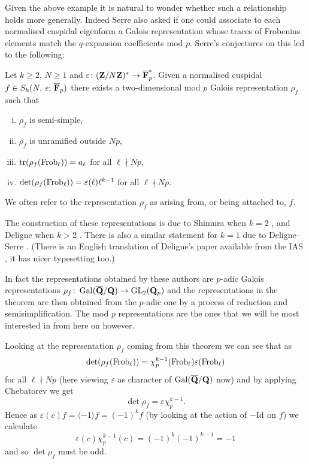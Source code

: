 \documentclass[a4paper,12pt]{article}
\begin{document}
Given the above example it is natural to wonder whether such a relationship holds more generally.
Indeed Serre also asked if one could associate to each normalised cuspidal eigenform a Galois representation whose traces of Frobenius elements match the $q$-expansion coefficients mod $p$.
Serre's conjectures on this led to the following: %

\begin{thm}\label{thm:assoc}
Let $k \ge 2$, $N \ge 1$ and $\varepsilon\colon (\mathbf{Z}/N\mathbf{Z})^* \to \overline{\mathbf{F}}_p^*$. Given a normalised cuspidal $f\in S_k(N,\,\varepsilon;\,\overline{\mathbf{F}}_p)$ there exists a two-dimensional mod $p$ Galois representation $\rho_f$ such that
\begin{enumerate}[(i)]
\item $\rho_f$ is semi-simple,
\item $\rho_f$ is unramified outside $Np$,
\item $\operatorname{tr}(\rho_f (\operatorname{Frob}_\ell)) = a_\ell$ for all $\ell \nmid Np$,
\item $\det(\rho_f (\operatorname{Frob}_\ell)) = \varepsilon(\ell)\ell^{k-1}$ for all $\ell \nmid Np$. %
\end{enumerate}
We often refer to the representation $\rho_f$ as arising from, or being attached to, $f$.
\end{thm}

The construction of these representations is due to Shimura when $k = 2$ \cite{Shimura}, and Deligne when $k > 2$ \cite{Deligne}.
There is also a similar statement for $k = 1$ due to Deligne--Serre \cite{DeligneSerre}.
(There is an English translation of Deligne's paper available from the IAS \cite{DeligneEng}, it has nicer typesetting too.) %

In fact the representations obtained by these authors are $p$-adic Galois representations $\rho_f\colon \operatorname{Gal}(\overline{\mathbf{Q}}/\mathbf{Q}) \to \operatorname{GL}_2(\mathbf{Q}_p)$ and the representations in the theorem are then obtained from the $p$-adic one by a process of reduction and semisimplification. %
The mod $p$ representations are the ones that we will be most interested in from here on however.

\begin{rmk}\label{rmk:detrho}
Looking at the representation $\rho_f$ coming from this theorem we can see that as
\[
\det(\rho_f(\operatorname{Frob}_\ell)) = \chi_p^{k-1}(\operatorname{Frob}_\ell)\varepsilon(\operatorname{Frob}_\ell)
\]
for all $\ell \nmid Np$ (here viewing $\varepsilon$ as character of $\operatorname{Gal}(\overline{\mathbf{Q}}/\mathbf{Q})$ now) and by applying Chebatorev we get %
\[
\det\rho_f = \varepsilon\chi_p^{k-1}.
\]
Hence as $\varepsilon(c)f = \langle -1 \rangle f = (-1)^k f$ (by looking at the action of $-\mathrm{Id}$ on $f$) we calculate
\[
\varepsilon(c)\chi_p^{k-1}(c) = (-1)^k(-1)^{k-1} = -1
\]
and so $\det\rho_f$ must be odd.
\end{rmk}
\end{document}
